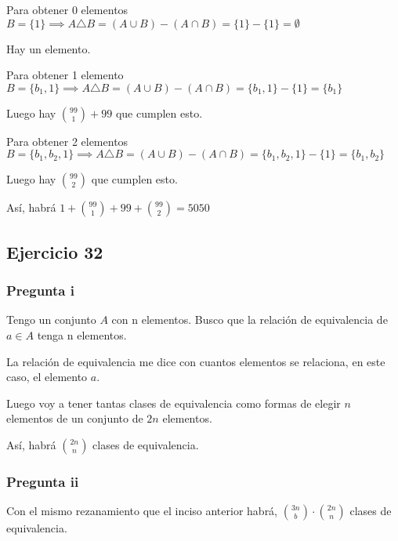 Para obtener 0 elementos $ B = \{ 1 \} \implies A \triangle B = (A \cup B) - (A \cap B) = \{ 1 \} - \{ 1 \} = \emptyset $

Hay un elemento.

Para obtener 1 elemento $ B = \{ b_1, 1 \} \implies A \triangle B = (A \cup B) - (A \cap B) = \{ b_1, 1 \} - \{ 1 \} = \{ b_1 \}$

Luego hay $ \binom{99}{1} + 99 $ que cumplen esto.

Para obtener 2 elementos $ B = \{ b_1, b_2, 1 \} \implies A \triangle B = (A \cup B) - (A \cap B) = \{ b_1, b_2, 1 \} - \{ 1 \} = \{ b_1, b_2 \}$

Luego hay $ \binom{99}{2} $ que cumplen esto.

Así, habrá $ 1 + \binom{99}{1} + 99 + \binom{99}{2} = 5050 $

\subsection{Ejercicio 32}
\subsubsection{Pregunta i}

Tengo un conjunto $A$ con n elementos. Busco que la relación de equivalencia de $ a \in A $ tenga n elementos.

La relación de equivalencia me dice con cuantos elementos se relaciona, en este caso, el elemento $a$.

Luego voy a tener tantas clases de equivalencia como formas de elegir $n$ elementos de un conjunto de $2n$ elementos.

Así, habrá $ \binom{2n}{n} $ clases de equivalencia.

\subsubsection{Pregunta ii}
Con el mismo rezanamiento que el inciso anterior habrá, $ \binom{3n}{b} \cdot \binom{2n}{n} $ clases de equivalencia. 


